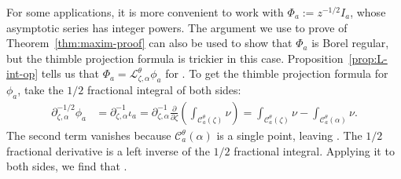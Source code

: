 \documentclass[10pt,a4paper]{amsart}
\newcommand{\fracderiv}[3]{\partial^{#1}_{#2, #3}}
\newcommand{\laplace}{\mathcal{L}}
\numberwithin{equation}{section}
\begin{document}
\begin{Remark}\label{rmk:1/2-deriv}
For some applications, it is more convenient to work with $\Phi_a := z^{-1/2} I_a$, whose asymptotic series has integer powers. The argument we use to prove of Theorem~\ref{thm:maxim-proof} can also be used to show that $\Phi_a$ is Borel regular, but the thimble projection formula is trickier in this case. Proposition~\ref{prop:L-int-op} tells us that $\Phi_a = \laplace^\theta_{\zeta, \alpha} \phi_a$ for
\smash{$\phi_a := \fracderiv{-1/2}{\zeta}{\alpha} \iota_a$}.
To get the thimble projection formula for $\phi_a$, take the $1/2$ fractional integral of both sides:
\begin{align*}
\fracderiv{-1/2}{\zeta}{\alpha} \phi_a & = \fracderiv{-1}{\zeta}{\alpha} \iota_a = \fracderiv{-1}{\zeta}{\alpha} \frac{\partial}{\partial \zeta} \left( \int_{\mathcal{C}_a^\theta(\zeta)}\nu \right) = \int_{\mathcal{C}_a^\theta(\zeta)}\nu - \int_{\mathcal{C}_a^\theta(\alpha)}\nu.
\end{align*}
The second term vanishes because $\mathcal{C}_a^\theta(\alpha)$ is a single point, leaving
\smash{$ \fracderiv{-1/2}{\zeta}{\alpha} \phi_a = \int_{\mathcal{C}_a^\theta(\zeta)}\nu$}.
The $1/2$ fractional derivative is a left inverse of the $1/2$ fractional integral. Applying it to both sides, we find that
\smash{$%
\phi_a = \fracderiv{1/2}{\zeta}{\alpha} \bigl( \int_{\mathcal{C}_a^\theta(\zeta)}\nu \bigr)$}.
\end{Remark}
\end{document}

